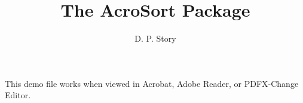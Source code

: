 \documentclass{article}
\title{The AcroSort Package}
\author{D. P. Story}
\begin{document}
\begin{center}
\end{center}

\smallskip{}
\centering{}\quad\StopSort{}{12bp}\quad{}

\vfill
This demo file works when viewed in \textsf{Acrobat}, \textsf{Adobe Reader}, or \textsf{PDFX-Change Editor}.
\end{document}
